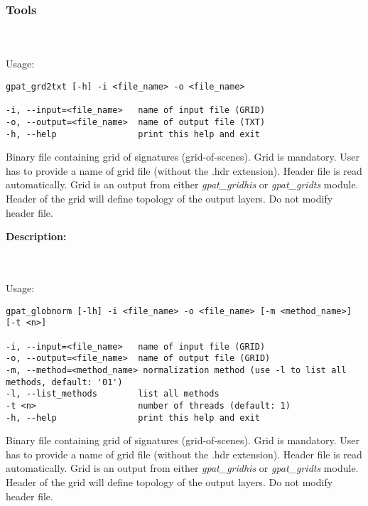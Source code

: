 \subsubsection{Tools}
{}
\\\\
Usage:

\begin{minipage}{\linewidth}
\begin{lstlisting}
gpat_grd2txt [-h] -i <file_name> -o <file_name>

-i, --input=<file_name>   name of input file (GRID)
-o, --output=<file_name>  name of output file (TXT)
-h, --help                print this help and exit
\end{lstlisting}
\end{minipage}


Binary file containing grid of signatures (grid-of-scenes). 
Grid is mandatory. 
User has to provide a name of grid file (without the .hdr extension). 
Header file is read automatically. 
Grid is an output from either {\it gpat\_gridhis} or {\it gpat\_gridts} module. 
Header of the grid will define topology of the output layers. 
Do not modify header file.


{\bf Description:}

{}
\\\\
Usage:

\begin{minipage}{\linewidth}
\begin{lstlisting}
gpat_globnorm [-lh] -i <file_name> -o <file_name> [-m <method_name>] [-t <n>]

-i, --input=<file_name>   name of input file (GRID)
-o, --output=<file_name>  name of output file (GRID)
-m, --method=<method_name> normalization method (use -l to list all methods, default: '01')
-l, --list_methods        list all methods
-t <n>                    number of threads (default: 1)
-h, --help                print this help and exit
\end{lstlisting}
\end{minipage}


Binary file containing grid of signatures (grid-of-scenes). 
Grid is mandatory. 
User has to provide a name of grid file (without the .hdr extension). 
Header file is read automatically. 
Grid is an output from either {\it gpat\_gridhis} or {\it gpat\_gridts} module. 
Header of the grid will define topology of the output layers. 
Do not modify header file.


